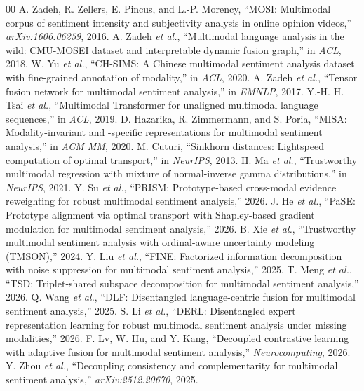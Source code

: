 \documentclass[conference]{IEEEtran}
\begin{document}
\begin{thebibliography}{00}
 A. Zadeh, R. Zellers, E. Pincus, and L.-P. Morency,
``MOSI: Multimodal corpus of sentiment intensity and subjectivity analysis in
online opinion videos,'' \emph{arXiv:1606.06259}, 2016.
 A. Zadeh \emph{et al.}, ``Multimodal language analysis in
the wild: CMU-MOSEI dataset and interpretable dynamic fusion graph,'' in
\emph{ACL}, 2018.
 W. Yu \emph{et al.}, ``CH-SIMS: A Chinese multimodal sentiment
analysis dataset with fine-grained annotation of modality,'' in \emph{ACL}, 2020.
 A. Zadeh \emph{et al.}, ``Tensor fusion network for
multimodal sentiment analysis,'' in \emph{EMNLP}, 2017.
 Y.-H. H. Tsai \emph{et al.}, ``Multimodal Transformer for
unaligned multimodal language sequences,'' in \emph{ACL}, 2019.
 D. Hazarika, R. Zimmermann, and S. Poria,
``MISA: Modality-invariant and -specific representations for multimodal sentiment
analysis,'' in \emph{ACM MM}, 2020.
 M. Cuturi, ``Sinkhorn distances: Lightspeed
computation of optimal transport,'' in \emph{NeurIPS}, 2013.
 H. Ma \emph{et al.}, ``Trustworthy multimodal regression
with mixture of normal-inverse gamma distributions,'' in \emph{NeurIPS}, 2021.
 Y. Su \emph{et al.}, ``PRISM: Prototype-based cross-modal
evidence reweighting for robust multimodal sentiment analysis,'' 2026.
 J. He \emph{et al.}, ``PaSE: Prototype alignment via optimal
transport with Shapley-based gradient modulation for multimodal sentiment
analysis,'' 2026.
 B. Xie \emph{et al.}, ``Trustworthy multimodal sentiment
analysis with ordinal-aware uncertainty modeling (TMSON),'' 2024.
 Y. Liu \emph{et al.}, ``FINE: Factorized information
decomposition with noise suppression for multimodal sentiment analysis,'' 2025.
 T. Meng \emph{et al.}, ``TSD: Triplet-shared subspace
decomposition for multimodal sentiment analysis,'' 2026.
 Q. Wang \emph{et al.}, ``DLF: Disentangled language-centric
fusion for multimodal sentiment analysis,'' 2025.
 S. Li \emph{et al.}, ``DERL: Disentangled expert representation
learning for robust multimodal sentiment analysis under missing modalities,'' 2026.
 F. Lv, W. Hu, and Y. Kang, ``Decoupled contrastive learning
with adaptive fusion for multimodal sentiment analysis,'' \emph{Neurocomputing},
2026.
 Y. Zhou \emph{et al.}, ``Decoupling consistency and
complementarity for multimodal sentiment analysis,'' \emph{arXiv:2512.20670}, 2025.
\end{thebibliography}
\end{document}
